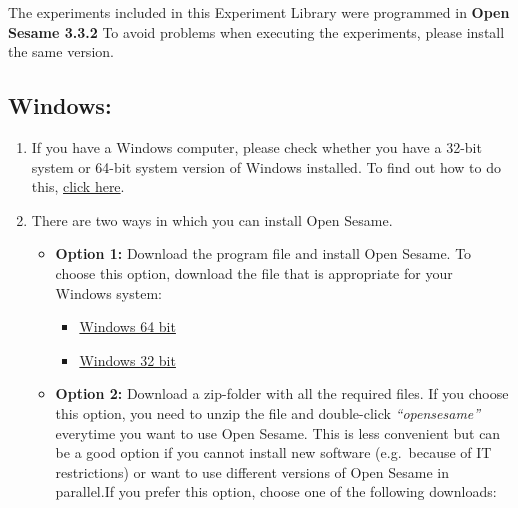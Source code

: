 \documentclass[
]{book}
\providecommand{\tightlist}{%
  \setlength{\itemsep}{0pt}\setlength{\parskip}{0pt}}
\begin{document}
The experiments included in this Experiment Library were programmed in \textbf{Open Sesame 3.3.2} To avoid problems when executing the experiments, please install the same version.

\hypertarget{windows}{%
\subsection{Windows:}\label{windows}}

\begin{enumerate}
\def\labelenumi{\arabic{enumi}.}
\tightlist
\item
  If you have a Windows computer, please check whether you have a 32-bit system or 64-bit system version of Windows installed. To find out how to do this, \href{https://www.howtogeek.com/howto/21726/how-do-i-know-if-im-running-32-bit-or-64-bit-windows-answers/}{click here}.
\item
  There are two ways in which you can install Open Sesame.

  \begin{itemize}
  \tightlist
  \item
    \textbf{Option 1:} Download the program file and install Open Sesame. To choose this option, download the file that is appropriate for your Windows system:

    \begin{itemize}
    \tightlist
    \item
      \href{https://github.com/smathot/OpenSesame/releases/download/release\%2F3.3.2/opensesame_3.3.2-py37-win64-1.exe}{Windows 64 bit}
    \item
      \href{https://github.com/smathot/OpenSesame/releases/download/release\%2F3.2.8/opensesame_3.2.8-py2.7-win32-1.exe}{Windows 32 bit}
    \end{itemize}
  \item
    \textbf{Option 2:} Download a zip-folder with all the required files. If you choose this option, you need to unzip the file and double-click \emph{``opensesame''} everytime you want to use Open Sesame. This is less convenient but can be a good option if you cannot install new software (e.g.~because of IT restrictions) or want to use different versions of Open Sesame in parallel.If you prefer this option, choose one of the following downloads:


\end{itemize}
\end{enumerate}
\end{document}
